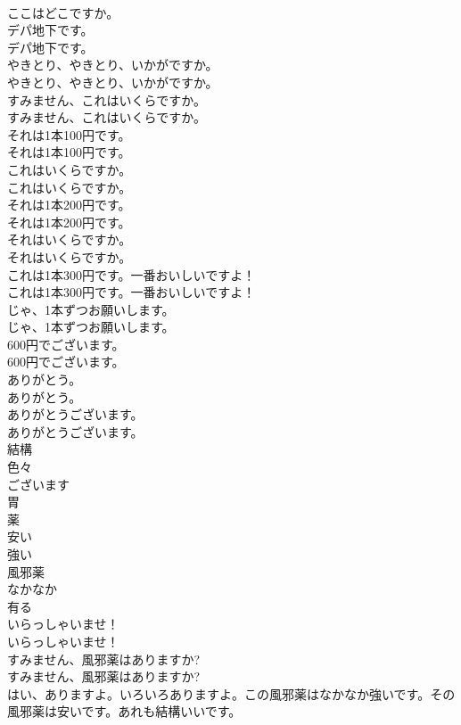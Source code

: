 \documentclass[8pt]{extreport}
\begin{document}
\begin{CJK}{UTF8}{min}
\\	ここはどこですか。 
\\	デパ地下です。	
\\	デパ地下です。 
\\	やきとり、やきとり、いかがですか。	
\\	やきとり、やきとり、いかがですか。 
\\	すみません、これはいくらですか。	
\\	すみません、これはいくらですか。 
\\	それは1本100円です。	
\\	それは1本100円です。 
\\	これはいくらですか。	
\\	これはいくらですか。 
\\	それは1本200円です。	
\\	それは1本200円です。 
\\	それはいくらですか。	
\\	それはいくらですか。 
\\	これは1本300円です。一番おいしいですよ！	
\\	これは1本300円です。一番おいしいですよ！ 
\\	じゃ、1本ずつお願いします。	
\\	じゃ、1本ずつお願いします。 
\\	600円でございます。	
\\	600円でございます。 
\\	ありがとう。	
\\	ありがとう。 
\\	ありがとうございます。	
\\	ありがとうございます。 
\\	結構
\\	色々
\\	ございます
\\	胃
\\	薬
\\	安い
\\	強い
\\	風邪薬
\\	なかなか
\\	有る
\\	いらっしゃいませ！	
\\	いらっしゃいませ！ 
\\	すみません、風邪薬はありますか?	
\\	すみません、風邪薬はありますか? 
\\	はい、ありますよ。いろいろありますよ。この風邪薬はなかなか強いです。その風邪薬は安いです。あれも結構いいです。	

\end{CJK}
\end{document}

